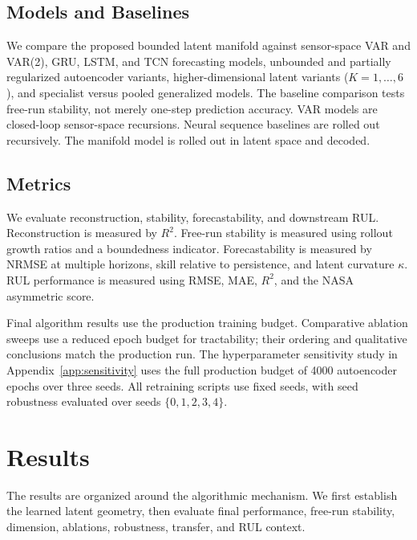 \documentclass[a4paper,fleqn]{cas-sc}
\begin{document}
\subsection{Models and Baselines}

We compare the proposed bounded latent manifold against sensor-space VAR and
VAR(2), GRU, LSTM, and TCN forecasting models, unbounded and partially
regularized autoencoder variants, higher-dimensional latent variants
($K=1,\ldots,6$), and specialist versus pooled generalized models. The baseline
comparison tests free-run stability, not merely one-step prediction accuracy.
VAR models are closed-loop sensor-space recursions. Neural sequence baselines
are rolled out recursively. The manifold model is rolled out in latent space
and decoded.

\subsection{Metrics}

We evaluate reconstruction, stability, forecastability, and downstream RUL.
Reconstruction is measured by $R^2$. Free-run stability is measured using
rollout growth ratios and a boundedness indicator. Forecastability is measured
by NRMSE at multiple horizons, skill relative to persistence, and latent
curvature $\kappa$. RUL performance is measured using RMSE, MAE, $R^2$, and
the NASA asymmetric score.

Final algorithm results use the production training budget. Comparative
ablation sweeps use a reduced epoch budget for tractability; their ordering and
qualitative conclusions match the production run. The hyperparameter
sensitivity study in Appendix~\ref{app:sensitivity} uses the full production
budget of 4000 autoencoder epochs over three seeds. All retraining scripts use
fixed seeds, with seed robustness evaluated over seeds $\{0,1,2,3,4\}$.

\section{Results}
\label{sec:results}

The results are organized around the algorithmic mechanism. We first establish
the learned latent geometry, then evaluate final performance, free-run
stability, dimension, ablations, robustness, transfer, and RUL context.
\end{document}
